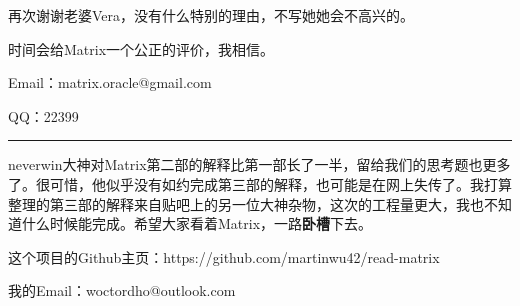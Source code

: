 \documentclass{ctexart}
\newcommand{\myparsep}{\noindent \rule[0.5ex]{\linewidth}{1pt}}
\begin{document}
再次谢谢老婆Vera，没有什么特别的理由，不写她她会不高兴的。

时间会给Matrix一个公正的评价，我相信。

Email：matrix.oracle@gmail.com

QQ：22399


\myparsep

neverwin大神对Matrix第二部的解释比第一部长了一半，留给我们的思考题也更多了。很可惜，他似乎没有如约完成第三部的解释，也可能是在网上失传了。我打算整理的第三部的解释来自贴吧上的另一位大神杂物，这次的工程量更大，我也不知道什么时候能完成。希望大家看着Matrix，一路{\bf 卧槽}下去。

这个项目的Github主页：https://github.com/martinwu42/read-matrix

我的Email：woctordho@outlook.com

\end{document}
